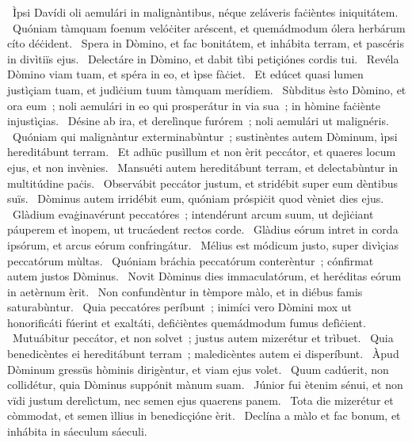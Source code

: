{~Ìpsi Davídi}
{%
oli aemulári in malignàntibus, néque zeláveris faċièntes iniquitátem. 
~Quóniam tàmquam foenum velóċiter aréscent, et quemádmodum ólera herbárum cíto déċident. 
~Spera in Dòmino, et fac bonitátem, et inhábita terram, et pascéris in divìtiïs ejus. 
~Delectáre in Dòmino, et dabit tìbi petiçiónes cordis tui. 
~Revéla Dòmino viam tuam, et spéra in eo, et ìpse fàċiet. 
~Et edúcet quasi lumen justìçiam tuam, et judìċium tuum tàmquam merídiem. 
~Sùbditus èsto Dòmino, et ora eum~; noli aemulári in eo qui prosperátur in via sua~; in hòmine faċiènte injustìçias. 
~Désine ab ira, et derelìnque furórem~; noli aemulári ut malignéris. 
~Quóniam qui malignàntur exterminabùntur~; sustinèntes autem Dòminum, ìpsi hereditábunt terram. 
~Et adhüc pusìllum et non èrit peccátor, et quaeres locum ejus, et non invènies. 
~Mansuéti autem hereditábunt terram, et delectabùntur in multitúdine paċis. 
~Observábit peccátor justum, et stridébit super eum dèntibus suïs. 
~Dòminus autem irridébit eum, quóniam próspiċit quod vèniet dies ejus. 
~Glàdium evaġinavérunt peccatóres~; intendérunt arcum suum, ut dejìċiant páuperem et ìnopem, ut trucáedent rectos corde. 
~Glàdius eórum intret in corda ipsórum, et arcus eórum confringátur. 
~Mélius est módicum justo, super divìçias peccatórum mùltas. 
~Quóniam bráchia peccatórum conterèntur~; cónfirmat autem justos Dòminus. 
~Novit Dòminus dies immaculatórum, et heréditas eórum in aetèrnum èrit. 
~Non confundèntur in tèmpore màlo, et in diébus famis saturabùntur. 
~Quia peccatóres períbunt~; inimíci vero Dòmini mox ut honorificáti fúerint et exaltáti, defiċièntes quemádmodum fumus defìċient. 
~Mutuábitur peccátor, et non solvet~; justus autem mizerétur et trìbuet. 
~Quia benedicèntes ei hereditábunt terram~; maledicèntes autem ei disperíbunt. 
~Àpud Dòminum gressüs hòminis dirigèntur, et viam ejus volet. 
~Quum cadúerit, non collidétur, quia Dòminus suppónit mànum suam. 
~Júnior fui ètenim sénui, et non vïdi justum derelìctum, nec semen ejus quaerens panem. 
~Tota die mizerétur et còmmodat, et semen ìllius in benedicçióne èrit. 
~Declína a màlo et fac bonum, et inhábita in sáeculum sáeculi. 
}
